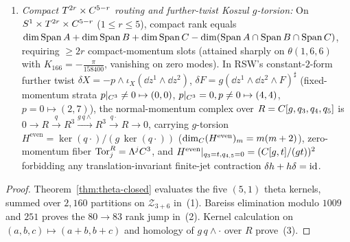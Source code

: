 \begin{theorem}
\begin{enumerate}[label=(\arabic*),leftmargin=*]
  \item \emph{Compact $T^{2r}\times C^{5-r}$ routing and further-twist Koszul $g$-torsion:} On $S^1\times T^{2r}\times C^{5-r}$ ($1\le r\le 5$), compact rank equals $\dim\operatorname{Span} A + \dim\operatorname{Span} B + \dim\operatorname{Span} C - \dim(\operatorname{Span} A\cap\operatorname{Span} B\cap\operatorname{Span} C)$, requiring $\ge 2r$ compact-momentum slots (attained sharply on $\theta(1,6,6)$ with $K_{166} = -\frac{\pi}{158400}$, vanishing on zero modes). In RSW's constant-$2$-form further twist $\delta X = -p\wedge\iota_X(\dd z^1\wedge\dd z^2)$, $\delta F = g(\dd z^1\wedge\dd z^2\wedge F)^\sharp$ (fixed-momentum strata $p|_{C^3}\neq 0 \mapsto (0,0)$, $p|_{C^3}=0,p\neq 0 \mapsto (4,4)$, $p=0 \mapsto (2,7)$), the normal-momentum complex over $R = C[g,q_3,q_4,q_5]$ is $0 \to R \xrightarrow{q} R^3 \xrightarrow{g\,q\wedge} R^3 \xrightarrow{q\cdot} R \to 0$, carrying $g$-torsion $H^{\mathrm{even}} = \ker(q\cdot)/(g\,\ker(q\cdot))$ ($\dim_{C}(H^{\mathrm{even}})_m = m(m+2)$), zero-momentum fiber $\operatorname{Tor}_j^R = \Lambda^jC^3$, and $H^{\mathrm{even}}|_{q_3=t,q_{4,5}=0} = (C[g,t]/(gt))^2$ forbidding any translation-invariant finite-jet contraction $\delta h + h\delta = \operatorname{id}$.
\end{enumerate}
\end{theorem}

\begin{proof}
Theorem~\ref{thm:theta-closed} evaluates the five $(5,1)$ theta kernels, summed over $2{,}160$ partitions on $\mathcal{Z}_{3+6}$ in~(1). Bareiss elimination modulo $1009$ and $251$ proves the $80 \to 83$ rank jump in~(2). Kernel calculation on $(a,b,c)\mapsto(a+b,b+c)$ and homology of $g\,q\wedge\cdot$ over $R$ prove~(3).
\end{proof}

